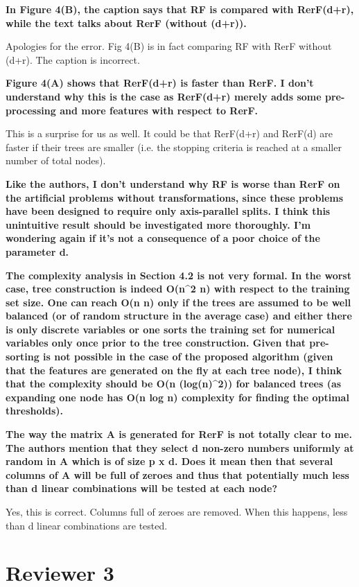 \textbf{In Figure 4(B), the caption says that RF is compared with RerF(d+r), while the text talks about RerF (without (d+r)).}

Apologies for the error. Fig 4(B) is in fact comparing RF with RerF without (d+r). The caption is incorrect.

\textbf{Figure 4(A) shows that RerF(d+r) is faster than RerF. I don’t understand why this is the case as RerF(d+r) merely adds some pre-processing and more features with respect to RerF.}

This is a surprise for us as well. It could be that RerF(d+r) and RerF(d) are faster if their trees are smaller (i.e. the stopping criteria is reached at a smaller number of total nodes).

\textbf{Like the authors, I don’t understand why RF is worse than RerF on the artificial problems without transformations, since these problems have been designed to require only axis-parallel splits. I think this unintuitive result should be investigated more thoroughly. I’m wondering again if it’s not a consequence of a poor choice of the parameter d.}

\textbf{The complexity analysis in Section 4.2 is not very formal. In the worst case, tree construction is indeed O(n^2 \log n) with respect to the training set size. One can reach O(n \log n) only if the trees are assumed to be well balanced (or of random structure in the average case) and either there is only discrete variables or one sorts the training set for numerical variables only once prior to the tree construction. Given that pre-sorting is not possible in the case of the proposed algorithm (given that the features are generated on the fly at each tree node), I think that the complexity should be O(n (log(n)^2)) for balanced trees (as expanding one node has O(n log n) complexity for finding the optimal thresholds).}

\textbf{The way the matrix A is generated for RerF is not totally clear to me. The authors mention that they select d non-zero numbers uniformly at random in A which is of size p x d. Does it mean then that several columns of A will be full of zeroes and thus that potentially much less than d linear combinations will be tested at each node?}

Yes, this is correct. Columns full of zeroes are removed. When this happens, less than d linear combinations are tested.

\section{Reviewer 3}

